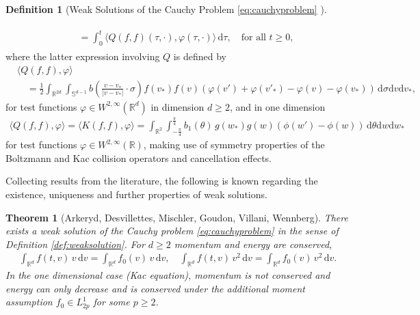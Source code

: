 \documentclass[11pt,a4paper,reqno]{amsart}
\theoremstyle{plain}
\newtheorem{theorem}[proposition]{Theorem}
\theoremstyle{definition}
\newtheorem{definition}[proposition]{Definition}
\begin{document}
\begin{definition}[Weak Solutions of the Cauchy Problem \eqref{eq:cauchyproblem} \cite{Ark81,Vil98,Des95}]
\begin{enumerate}[label=(\roman*)]
\begin{align}
\begin{split}
			&\quad = \int_0^t \langle Q(f,f)(\tau, \cdot), \varphi(\tau,\cdot) \rangle \, \mathrm{d}\tau, \quad \text{for all } t\geq 0,
			\end{split}
		\end{align}
		where the latter expression involving $Q$ is defined by
		\begin{align*}
			&\langle Q(f,f), \varphi \rangle \\%
			&\quad = \frac{1}{2}\int_{{\mathbb{R}}^{2d}}\int_{{\mathbb{S}}^{d-1}} b\left(\frac{v-v_*}{|v-v_*|}\cdot \sigma\right) f(v_*) f(v) \left( \varphi(v')+\varphi(v'_*) - \varphi(v) - \varphi(v_*)\right) \, \mathrm{d}\sigma \mathrm{d}v\mathrm{d}v_*,
		\end{align*}
		for test functions $\varphi \in W^{2,\infty}({\mathbb{R}}^d)$ in dimension $d\geq 2$, and in one dimension
		\begin{align*}
		
		\langle Q(f,f), \varphi\rangle = \langle K(f,f), \varphi \rangle =\int_{{\mathbb{R}}^2} \int_{-\tfrac{\pi}{4}}^{\tfrac{\pi}{4}} b_1(\theta) \, g(w_*) g(w) \left(\phi(w') - \phi(w)\right) \, \mathrm{d}\theta\mathrm{d}w  \mathrm{d}w_*
		\end{align*}
		for test functions $\varphi \in W^{2,\infty}({\mathbb{R}})$, making use of symmetry properties of the Boltzmann and Kac collision operators and cancellation effects.
	\end{enumerate}
\end{definition}

Collecting results from the literature, the following is known regarding the existence, uniqueness and further properties of weak solutions.

\begin{theorem}[Arkeryd, Desvillettes, Mischler, Goudon, Villani, Wennberg]\label{thm:existence}
There exists a weak solution of the Cauchy problem \eqref{eq:cauchyproblem} in the sense of Definition \ref{def:weaksolution}.
For $d\geq 2$ momentum and energy are conserved,
\begin{align}
	\int_{{\mathbb{R}}^d} f(t,v) \, v \,\mathrm{d}v = \int_{{\mathbb{R}}^d} f_0(v)\, v \,\mathrm{d}v, \quad 	\int_{{\mathbb{R}}^d} f(t,v) \,v^2 \,\mathrm{d}v = \int_{{\mathbb{R}}^d} f_0(v)\, v^2 \,\mathrm{d}v.
\end{align}
In the one dimensional case (Kac equation), momentum is not conserved and energy can only decrease and is conserved under the additional moment assumption $f_0\in L^1_{2p}$ for some $p\geq2$.
\end{theorem}
\end{document}
